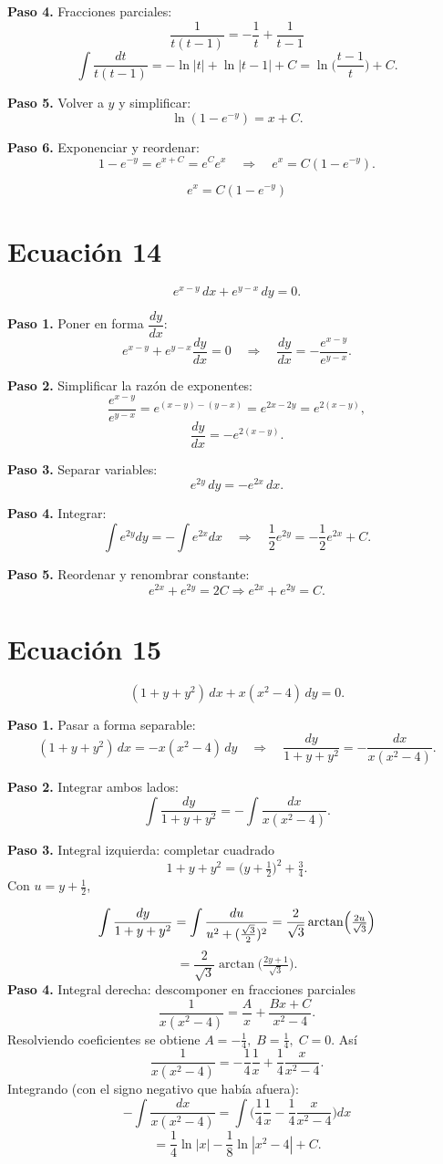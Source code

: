 \documentclass[12pt,a4paper]{article}
\begin{document}
\begin{multicols}{2}
	\textbf{Paso 4.} Fracciones parciales:
	\[
	\frac{1}{t(t-1)}=-\frac{1}{t}+\frac{1}{t-1}
	\]
	\[
	\int\frac{dt}{t(t-1)}=-\ln|t|+\ln|t-1|+C=\ln\!\Big(\frac{t-1}{t}\Big)+C.
	\]
	
	\textbf{Paso 5.} Volver a \(y\) y simplificar:
	\[
	\ln(1-e^{-y})=x+C.
	\]
	
	\textbf{Paso 6.} Exponenciar y reordenar:
	\[
	1-e^{-y}=e^{x+C}=e^{C}e^{x}\quad\Rightarrow\quad e^{x}=C(1-e^{-y}).
	\]
	
	\[
	\boxed{e^{x}=C(1-e^{-y})}
	\]
	
	\section*{Ecuación 14}
	\[
	e^{x-y}\,dx+e^{y-x}\,dy=0.
	\]
	
	\textbf{Paso 1.} Poner en forma \(\dfrac{dy}{dx}\):
	\[
	e^{x-y}+e^{y-x}\frac{dy}{dx}=0
	\quad\Rightarrow\quad
	\frac{dy}{dx}=-\frac{e^{x-y}}{e^{y-x}}.
	\]
	
	\textbf{Paso 2.} Simplificar la razón de exponentes:
	\[
	\frac{e^{x-y}}{e^{y-x}}=e^{(x-y)-(y-x)}=e^{2x-2y}=e^{2(x-y)},
	\]
	\[
	\frac{dy}{dx}=-e^{2(x-y)}.
	\]
	
	\textbf{Paso 3.} Separar variables:
	\[
	e^{2y}\,dy=-e^{2x}\,dx.
	\]
	
	\textbf{Paso 4.} Integrar:
	\[
	\int e^{2y}dy=-\int e^{2x}dx
	\quad\Rightarrow\quad
	\frac{1}{2}e^{2y}=-\frac{1}{2}e^{2x}+C.
	\]
	
	\textbf{Paso 5.} Reordenar y renombrar constante:
	\[
	e^{2x}+e^{2y}=2C \Rightarrow \boxed{e^{2x}+e^{2y}=C.}
	\]
	
	\section*{Ecuación 15}
	\[
	(1+y+y^{2})\,dx + x(x^{2}-4)\,dy = 0.
	\]
	
	\textbf{Paso 1.} Pasar a forma separable:
	\[
	(1+y+y^{2})\,dx = -x(x^{2}-4)\,dy
	\quad\Rightarrow\quad
	\frac{dy}{1+y+y^{2}} = -\frac{dx}{x(x^{2}-4)}.
	\]
	
	\textbf{Paso 2.} Integrar ambos lados:
	\[
	\int\frac{dy}{1+y+y^{2}} = -\int\frac{dx}{x(x^{2}-4)}.
	\]
	
	\textbf{Paso 3.} Integral izquierda: completar cuadrado
	\[
	1+y+y^{2}=\Big(y+\tfrac{1}{2}\Big)^{2}+\tfrac{3}{4}.
	\]
	Con \(u=y+\tfrac{1}{2}\),
	
	\[
	\int\frac{dy}{1+y+y^{2}} 
	= \int\frac{du}{u^{2}+(\tfrac{\sqrt{3}}{2})^{2}}\\
	= \frac{2}{\sqrt{3}}\arctan\!\Big(\tfrac{2u}{\sqrt{3}}\Big)\\
	\]
	\[
	= \frac{2}{\sqrt{3}}\arctan\!\Big(\tfrac{2y+1}{\sqrt{3}}\Big).
	\]
	\textbf{Paso 4.} Integral derecha: descomponer en fracciones parciales
	\[
	\frac{1}{x(x^{2}-4)}=\frac{A}{x}+\frac{Bx+C}{x^{2}-4}.
	\]
	Resolviendo coeficientes se obtiene \(A=-\tfrac{1}{4},\;B=\tfrac{1}{4},\;C=0\). Así
	\[
	\frac{1}{x(x^{2}-4)}=-\frac{1}{4}\frac{1}{x}+\frac{1}{4}\frac{x}{x^{2}-4}.
	\]
	Integrando (con el signo negativo que había afuera):
	\[
	-\int\frac{dx}{x(x^{2}-4)}=\int\Big(\frac{1}{4}\frac{1}{x}-\frac{1}{4}\frac{x}{x^{2}-4}\Big)dx
	\]
	\[	
	=\frac{1}{4}\ln|x|-\frac{1}{8}\ln|x^{2}-4|+C.
	\]
	

\end{multicols}
\end{document}
